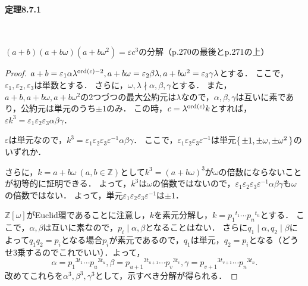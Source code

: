 \paragraph{定理8.7.1}~
\begin{screen}
  $(a+b)(a+b \omega)(a+b \omega^2) = \varepsilon c^3$の分解（p.270の最後とp.271の上）
\end{screen}
\begin{proof}
  $a+b = \varepsilon_1 \alpha \lambda^{ \operatorname{ord}(c)-2}, a+b \omega = \varepsilon_2 \beta \lambda, a+b \omega^2 = \varepsilon_3 \gamma \lambda$とする．
  ここで，$ \varepsilon_1, \varepsilon_2, \varepsilon_3$は単数とする．
  さらに，$ \omega, \lambda \nmid \alpha, \beta, \gamma$とする．
  また，$a+b, a+b \omega, a+b \omega^2$の2つづつの最大公約元は$ \lambda$なので，$ \alpha, \beta, \gamma$は互いに素であり，公約元は単元のうち$ \pm 1$のみ．
  この時，$c = \lambda^{ \operatorname{ord}(c)}k$とすれば，$ \varepsilon k^3 = \varepsilon_1 \varepsilon_2 \varepsilon_3 \alpha \beta \gamma$．

  $ \varepsilon$は単元なので，$k^3 = \varepsilon_1 \varepsilon_2 \varepsilon_3 \varepsilon^{-1} \alpha \beta \gamma$．
  ここで，$ \varepsilon_1 \varepsilon_2 \varepsilon_3 \varepsilon^{-1}$は単元$ \set{ \pm 1, \pm \omega, \pm \omega^2}$のいずれか．

  さらに，$k = a+b \omega \ (a, b \in \mathbb{Z})$として$k^3 = (a+b \omega)^3$が$ \omega$の倍数にならないことが初等的に証明できる．
  よって，$k^3$は$ \omega$の倍数ではないので，$ \varepsilon_1 \varepsilon_2 \varepsilon_3 \varepsilon^{-1} \alpha \beta \gamma$も$ \omega$の倍数ではない．
  よって，単元$ \varepsilon_1 \varepsilon_2 \varepsilon_3 \varepsilon^{-1}$は$ \pm 1$．

  $ \mathbb{Z}[ \omega]$がEuclid環であることに注意し，$k$を素元分解し，$k = p_1{}^{t_1} \cdots p_n{}^{t_n}$とする．
  ここで，$ \alpha, \beta$は互いに素なので，$p_i \mid \alpha, \beta$となることはない．
  さらに$q_1 \mid \alpha, q_2 \mid \beta$によって$q_1q_2 = p_i$となる場合$p_i$が素元であるので，$q_1$は単元，$q_2 = p_i$となる（どうせ3乗するのでこれでいい）．よって，
  \[ \alpha = p_1{}^{3t_1} \cdots p_u{}^{3t_u}, \beta = p_{u+1}{}^{3t_{u+1}} \cdots p_v{}^{3t_v}, \gamma = p_{v+1}{}^{3t_{v+1}} \cdots p_n{}^{3t_n}. \]
  改めてこれらを$ \alpha^3, \beta^3, \gamma^3$として，示すべき分解が得られる．
\end{proof}

\setcounter{section}{10}
